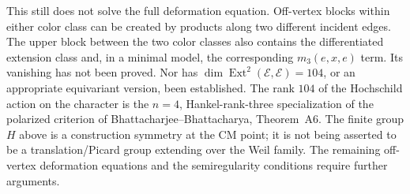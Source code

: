 This still does not solve the full deformation equation.  Off-vertex blocks within either color class can be created by
products along two different incident edges.  The upper block
between the two color classes also contains the differentiated
extension class and, in a minimal model, the corresponding
\(m_3(e,x,e)\) term.  Its vanishing has not been proved.  Nor has
\(\dim\operatorname{Ext}^2(\mathcal E,\mathcal E)=104\), or an
appropriate equivariant version, been established.  The rank
\(104\) of the Hochschild action on the character is the
\(n=4\), Hankel-rank-three specialization of the polarized
criterion of Bhattacharjee--Bhattacharya, Theorem~A6.  The finite
group \(H\) above is a construction symmetry at the CM point;
it is not being asserted to be a translation/Picard group extending
over the Weil family.  The remaining off-vertex deformation equations
and the semiregularity conditions require further arguments.

